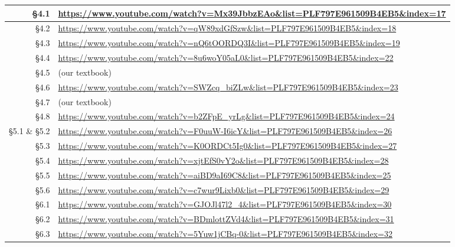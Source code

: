\documentclass[12pt]{article}
\newcounter{ex}\setcounter{ex}{0}
\begin{document}
\begin{tabular} {|r| l |}
\S4.1 & \url{https://www.youtube.com/watch?v=Mx39JbbzEAo&list=PLF797E961509B4EB5&index=17} \\ \hline
\S4.2 & \url{https://www.youtube.com/watch?v=qW89xdGfSzw&list=PLF797E961509B4EB5&index=18} \\ \hline
\S4.3 & \url{https://www.youtube.com/watch?v=nQ6tOORDQ3I&list=PLF797E961509B4EB5&index=19} \\ \hline
\S4.4 & \url{https://www.youtube.com/watch?v=8u6woY05aL0&list=PLF797E961509B4EB5&index=22}  \\ \hline
\S4.5 &  (our textbook)    \\ \hline
\S4.6 & \url{https://www.youtube.com/watch?v=SWZcq_biZLw&list=PLF797E961509B4EB5&index=23} \\ \hline
\S4.7 & (our textbook)   \\ \hline
\S4.8 & \url{https://www.youtube.com/watch?v=b2ZFpE_yrLg&list=PLF797E961509B4EB5&index=24} \\ \hline
\S5.1 \& \S5.2  & \url{https://www.youtube.com/watch?v=F0uuW-I6icY&list=PLF797E961509B4EB5&index=26}  \\ \hline
\S5.3 & \url{https://www.youtube.com/watch?v=K0ORDCt5Ig0&list=PLF797E961509B4EB5&index=27} \\ \hline
\S5.4 & \url{https://www.youtube.com/watch?v=xjtEfS0vY2o&list=PLF797E961509B4EB5&index=28} \\ \hline
\S5.5 & \url{https://www.youtube.com/watch?v=aiBD9aI69C8&list=PLF797E961509B4EB5&index=25} \\ \hline
\S5.6 & \url{https://www.youtube.com/watch?v=c7wur9Lixb0&list=PLF797E961509B4EB5&index=29}  \\ \hline
\S6.1 &  \url{https://www.youtube.com/watch?v=GJOJl47l2_4&list=PLF797E961509B4EB5&index=30}  \\ \hline
\S6.2 & \url{https://www.youtube.com/watch?v=BDmlottZVd4&list=PLF797E961509B4EB5&index=31}  \\ \hline
\S6.3 & \url{https://www.youtube.com/watch?v=5Yuw1jCBq-0&list=PLF797E961509B4EB5&index=32}   \\ \hline
\end{tabular}
\end{document}
